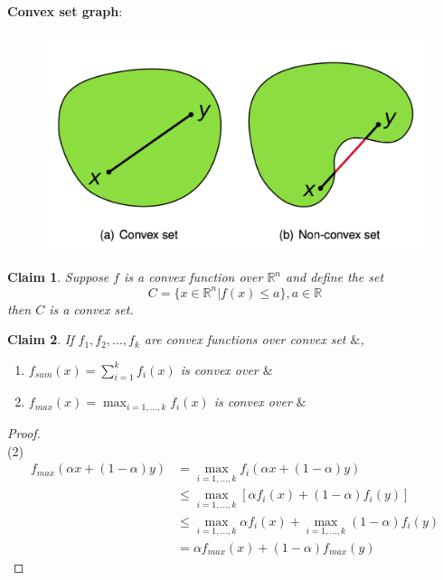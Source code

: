 \documentclass[11pt,a4paper]{article}
\newtheorem{claim}{Claim}
\begin{document}
\textbf{Convex set graph}:
\begin{center}\begin{figure}[htbp]
    \centering
    \includegraphics[scale=0.3]{Convex_set.png}
    \caption{}
    \label{}
\end{figure}\end{center}

\begin{claim}
Suppose $f$ is a convex function over $\mathbb{R}^n$ and define the set $$C=\{x\in \mathbb{R}^n| f(x)\leq a\}, a\in \mathbb{R}$$ then $C$ is a convex set.
\end{claim}

\begin{claim}
If $f_1,f_2,...,f_k$ are convex functions over convex set $\&$,
\begin{enumerate}
    \item $f_{sum}(x)=\sum_{i=1}^kf_i(x)$ is convex over $\&$
    \item $f_{max}(x)=\max_{i=1,...,k}f_i(x)$ is convex over $\&$
\end{enumerate}
\end{claim}
\begin{proof}
\quad\\
(2)
\begin{equation}
    \begin{aligned}
        f_{max}(\alpha x+(1-\alpha)y)&=\max_{i=1,...,k}f_i(\alpha x+(1-\alpha)y)\\
    &\leq \max_{i=1,...,k}[\alpha f_i(x)+(1-\alpha)f_i(y)]\\
    &\leq \max_{i=1,...,k}\alpha f_i(x)+\max_{i=1,...,k}(1-\alpha)f_i(y)\\
    &=\alpha f_{max}(x)+(1-\alpha)f_{max}(y)
    \end{aligned}
    \nonumber
\end{equation}
\end{proof}
\end{document}
